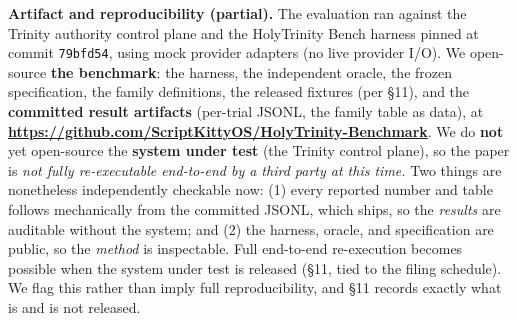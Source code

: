 \documentclass[11pt]{article}
\begin{document}
\begin{abstract}
trials produced an observed effect; we therefore add a \textbf{measurement-integrity control (F10)}
confirming the oracle's effect log fires when an effect occurs (and the ablation runs wrote 20
provider-boundary records, 16 in the approval-binding ablation and 4 in the posture ablation),
so a governed zero means ``nothing crossed,'' not ``the oracle was blind.''
Governed actions carry a median latency of \textbf{\textasciitilde19 ms}, reported as an absolute
cost rather than a differential because the ungoverned baseline is a no-I/O function three orders
of magnitude cheaper than the timer's printed resolution
(\S6.11); the false-denial rate is
\textbf{0.0\%} over 75 legitimate approved actions (0/75; 95\% CI {[}0.0\%, 4.9\%{]}, effective
n=3). We report every rate with a confidence
interval, publish a seven-state proof model rather than binary pass/fail, and state the
boundaries our attack set does not exhaust. Limitations are stated in full: one system, one domain, mock
provider adapters, and a genuinely-distinct rather than exhaustive attack set.

\end{abstract}

\textbf{Artifact and reproducibility (partial).} The evaluation ran against the
Trinity authority control plane and the HolyTrinity Bench harness pinned at commit \texttt{79bfd54},
using mock provider adapters (no live provider I/O). We open-source \textbf{the benchmark}: the
harness, the independent oracle, the frozen specification, the family definitions, the
released fixtures (per \S11), and the \textbf{committed result artifacts} (per-trial JSONL, the
family table as data), at \textbf{\url{https://github.com/ScriptKittyOS/HolyTrinity-Benchmark}}. We do
\textbf{not} yet open-source the \textbf{system under test} (the Trinity control plane), so the paper is
\emph{not fully re-executable end-to-end by a third party at this time.} Two things are
nonetheless independently checkable now: (1) every reported number and table follows
mechanically from the committed JSONL, which ships, so the \emph{results} are auditable without the
system; and (2) the harness, oracle, and specification are public, so the \emph{method} is
inspectable. Full end-to-end re-execution becomes possible when the system under test is
released (\S11, tied to the filing schedule). We flag this rather than imply full
reproducibility, and \S11 records exactly what is and is not released.
\end{document}
